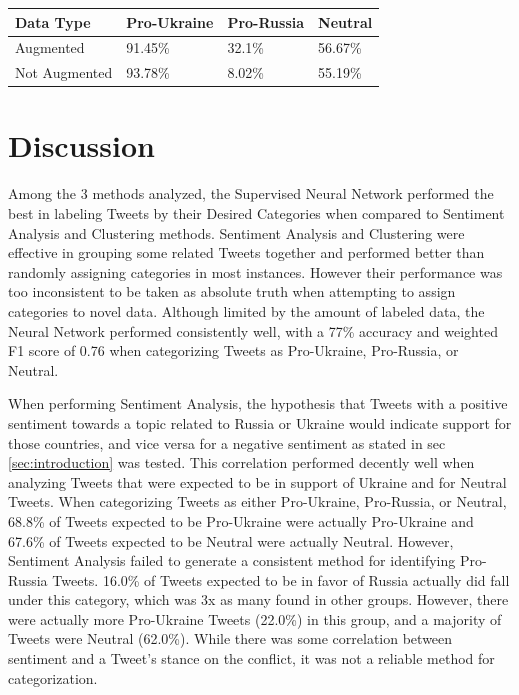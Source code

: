 \documentclass[12pt,letterpaper,oneside,titlepage]{article}
\begin{document}
\begin{center}
\begin{tabular}{llll}
\toprule
	Data Type & Pro-Ukraine & Pro-Russia & Neutral \\
	\midrule
    Augmented       & 91.45\%  &      32.1\% &  56.67\% \\
    Not Augmented & 93.78\% &      8.02\%  &  55.19\% \\
	\bottomrule
	\end{tabular}
    \captionsetup{justification=centering}
    \label{nn-classtable}
\end{center}

\section{Discussion}\label{sec:discussion}

Among the 3 methods analyzed, the Supervised Neural Network performed the best in labeling Tweets by their Desired Categories 
when compared to Sentiment Analysis and Clustering methods. 
Sentiment Analysis and Clustering were effective in grouping some related Tweets together and performed better than 
randomly assigning categories in most instances. However their performance was too inconsistent to be taken as absolute truth when 
attempting to assign categories to novel data. Although limited by the amount of labeled data, the Neural Network 
performed consistently well, with a 77\% accuracy and weighted F1 score of 0.76 when categorizing Tweets as Pro-Ukraine, Pro-Russia, or Neutral.

When performing Sentiment Analysis, the hypothesis that Tweets with a positive sentiment towards a topic related to 
Russia or Ukraine would indicate support for those countries, and vice versa for a negative sentiment as stated in 
sec \ref{sec:introduction} was tested. This correlation performed decently well when analyzing Tweets that were 
expected to be in support of Ukraine and for Neutral Tweets. When categorizing Tweets as either Pro-Ukraine, Pro-Russia, or Neutral, 68.8\% of Tweets expected to be Pro-Ukraine were 
actually Pro-Ukraine and 67.6\% of Tweets expected to be Neutral were actually Neutral.
However, Sentiment Analysis failed to generate a consistent method for 
identifying Pro-Russia Tweets. 16.0\% of Tweets expected to be in favor of Russia actually did fall under this category, 
which was 3x as many found in other groups. However, there were actually more Pro-Ukraine Tweets (22.0\%) in this 
group, and a majority of Tweets were Neutral (62.0\%). While there was some correlation between sentiment and a 
Tweet's stance on the conflict, it was not a reliable method for categorization.
\end{document}
